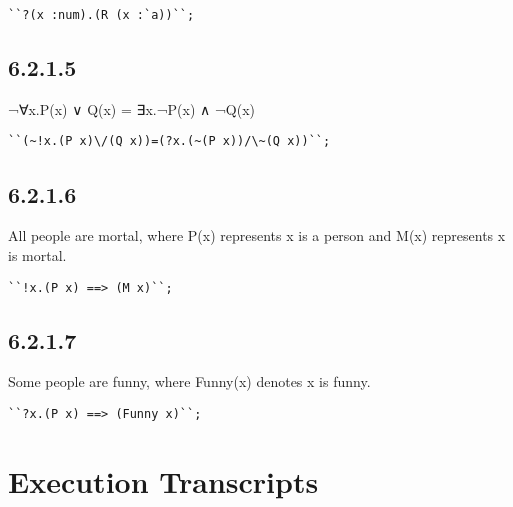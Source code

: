 \documentclass{report}
\begin{document}
\lstset{frameround=tttt}
\begin{lstlisting}[frame=tRBL]
``?(x :num).(R (x :`a))``;
\end{lstlisting}

\subsection{6.2.1.5}
\label{sec:6.2.1.5}
¬∀x.P(x) ∨ Q(x) = ∃x.¬P(x) ∧ ¬Q(x)

\lstset{frameround=tttt}
\begin{lstlisting}[frame=tRBL]
``(~!x.(P x)\/(Q x))=(?x.(~(P x))/\~(Q x))``;
\end{lstlisting}

\subsection{6.2.1.6}
\label{sec:6.2.1.6}

All people are mortal, where P(x) represents x is a person and M(x) represents x is mortal.

\lstset{frameround=tttt}
\begin{lstlisting}[frame=tRBL]
``!x.(P x) ==> (M x)``;
\end{lstlisting}

\subsection{6.2.1.7}
\label{sec:6.2.1.7}

Some people are funny, where Funny(x) denotes x is funny.

\lstset{frameround=tttt}
\begin{lstlisting}[frame=tRBL]
``?x.(P x) ==> (Funny x)``;
\end{lstlisting}


\section{Execution Transcripts}
\label{sec:exec-transcr-5}
\end{document}
